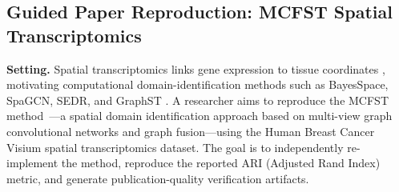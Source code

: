 \documentclass[sn-basic,Numbered,pdflatex]{sn-jnl}
\begin{document}
\FloatBarrier
\subsection{Guided Paper Reproduction: MCFST Spatial Transcriptomics}

\textbf{Setting.} Spatial transcriptomics links gene expression to tissue coordinates \cite{stahl2016spatial}, motivating computational domain-identification methods such as BayesSpace, SpaGCN, SEDR, and GraphST \cite{zhao2021bayesspace,hu2021spagcn,xu2024sedr,long2023graphst}. A researcher aims to reproduce the MCFST method~\cite{MCFST2025}---a spatial domain identification approach based on multi-view graph convolutional networks and graph fusion---using the Human Breast Cancer Visium spatial transcriptomics dataset. The goal is to independently re-implement the method, reproduce the reported ARI (Adjusted Rand Index) metric, and generate publication-quality verification artifacts.
\end{document}
